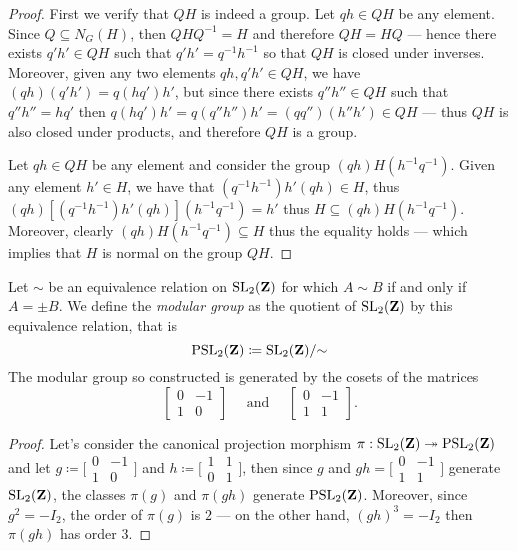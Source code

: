 \begin{proof}
First we verify that \(Q H\) is indeed a group. Let \(q h \in Q H\) be any
element. Since \(Q \subseteq N_G(H)\), then \(Q H Q^{-1} = H\) and therefore \(Q
H = H Q\) --- hence there exists \(q' h' \in Q H\) such that \(q' h' = q^{-1}
h^{-1}\) so that \(Q H\) is closed under inverses. Moreover, given any two
elements \(q h, q' h' \in Q H\), we have \((q h)(q' h') = q (h q') h'\), but
since there exists \(q'' h'' \in Q H\) such that \(q'' h'' = h q'\) then \(q(h
q') h' = q (q'' h'') h' = (q q'') (h'' h') \in Q H\) --- thus \(Q H\) is also
closed under products, and therefore \(Q H\) is a group.

Let \(q h \in Q H\) be any element and consider the group \((q h) H (h^{-1}
q^{-1})\). Given any element \(h' \in H\), we have that \((q^{-1} h^{-1}) h' (q
h) \in H\), thus \((q h) [(q^{-1} h^{-1}) h' (q h)] (h^{-1} q ^{-1}) = h'\) thus
\(H \subseteq (q h) H (h^{-1} q^{-1})\). Moreover, clearly \((q h) H (h^{-1}
q^{-1}) \subseteq H\) thus the equality holds --- which implies that \(H\) is
normal on the group \(Q H\).
\end{proof}

\begin{proposition}
\label{prop:PSL_2(Z)-generators}
Let \(\sim\) be an equivalence relation on \(\operatorname{SL}_2(\mathbf{Z})\) for which \(A \sim B\)
if and only if \(A = \pm B\). We define the \emph{modular group} as the quotient
of \(\operatorname{SL}_2(\mathbf{Z})\) by this equivalence relation, that is
\[
\operatorname{PSL}_2(\mathbf{Z}) \coloneq \operatorname{SL}_2(\mathbf{Z})/{\sim}
\]
The modular group so constructed is generated by the cosets of the matrices
\[
\begin{bmatrix}
  0 & -1 \\ 1 & 0
\end{bmatrix}
\quad
\text{ and }
\quad
\begin{bmatrix}
  0 & -1 \\ 1 & 1
\end{bmatrix}.
\]
\end{proposition}

\begin{proof}
Let's consider the canonical projection morphism \(\pi: \operatorname{SL}_2(\mathbf{Z}) \twoheadrightarrow
\operatorname{PSL}_2(\mathbf{Z})\) and let \(g \coloneq \big[
\begin{smallmatrix}
  0 & -1 \\ 1 & 0
\end{smallmatrix} \big]
\) and \(h \coloneq \big[
\begin{smallmatrix}
  1 & 1 \\ 0 & 1
\end{smallmatrix} \big]\), then since \(g\) and \(g h = \big[
\begin{smallmatrix}
  0 & -1 \\ 1 & 1
\end{smallmatrix} \big]\) generate \(\operatorname{SL}_2(\mathbf{Z})\), the classes \(\pi(g)\) and
\(\pi(gh)\) generate \(\operatorname{PSL}_2(\mathbf{Z})\). Moreover, since \(g^2 = -I_2\), the order
of \(\pi(g)\) is \(2\) --- on the other hand, \((g h)^3 = -I_2\) then
\(\pi(gh)\) has order \(3\).
\end{proof}

